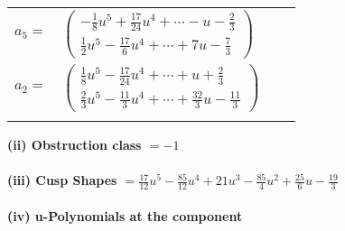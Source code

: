 \documentclass[1p]{elsarticle_modified}
\theoremstyle{definition}
\begin{document}
\begin{tabular}{m{7pt} m{180pt} m{7pt} m{180pt} }
\flushright $a_{5}=$&$\begin{pmatrix}-\frac{1}{8} u^5+\frac{17}{24} u^4+\cdots- u-\frac{2}{3}\\\frac{1}{2} u^5-\frac{17}{6} u^4+\cdots+7 u-\frac{7}{3}\end{pmatrix}$ \\
\flushright $a_{2}=$&$\begin{pmatrix}\frac{1}{8} u^5-\frac{17}{24} u^4+\cdots+u+\frac{2}{3}\\\frac{2}{3} u^5-\frac{11}{3} u^4+\cdots+\frac{32}{3} u-\frac{11}{3}\end{pmatrix}$\\&\end{tabular}
\flushleft \textbf{(ii) Obstruction class $= -1$}\\~\\
\flushleft \textbf{(iii) Cusp Shapes $= \frac{17}{12} u^5-\frac{85}{12} u^4+21 u^3-\frac{85}{4} u^2+\frac{25}{6} u-\frac{19}{3}$}\\~\\
\newpage\renewcommand{\arraystretch}{1}
\flushleft \textbf{(iv) u-Polynomials at the component}\newline \\
\end{document}
